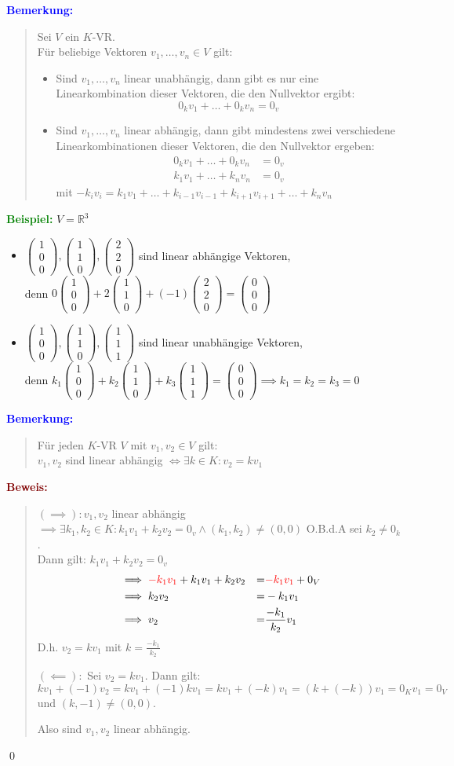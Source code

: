 \documentclass{article}
\newcommand{\blue}[1]{\textcolor{blue}{#1}}
\newcommand{\green}[1]{\textcolor{green}{#1}}
\newcommand{\maroon}[1]{\textcolor{maroon}{#1}}
\newcommand{\ex}{\green{\textbf{Beispiel: }}}
\newcommand{\an}[1]{\blue{\textbf{Bemerkung: }}\begin{quote}#1\end{quote}}
\newcommand{\pr}[1]{\maroon{\textbf{Beweis: }}\begin{quote}#1\end{quote}\qed}
\newcommand{\R}{\mathbb{R}}
\newcommand{\vvvec}[3]{\begin{pmatrix}#1\\#2\\#3\end{pmatrix}}
\begin{document}
\an{
    Sei $V$ ein $K$-VR.\\
    Für beliebige Vektoren $v_1, \dots, v_n \in V$ gilt:
    \begin{itemize}
        \item Sind $v_1, \dots, v_n$ linear unabhängig, dann gibt es nur eine Linearkombination dieser Vektoren, die den Nullvektor ergibt:
        \[
            0_kv_1 + \dots + 0_kv_n = 0_v
        \]
        \item Sind $v_1, \dots, v_n$ linear abhängig, dann gibt mindestens zwei verschiedene Linearkombinationen dieser Vektoren, die den Nullvektor ergeben:
        \[
            \begin{split}
                0_kv_1 + \dots + 0_kv_n &= 0_v\\
                k_1v_1 + \dots + k_nv_n &= 0_v
            \end{split}
        \]
        mit $-k_iv_i = k_1v_1 + \dots + k_{i-1}v_{i-1} + k_{i+1}v_{i+1} + \dots + k_nv_n$
    \end{itemize}
}
\ex $V = \R^3$
\begin{itemize}
    \item $\vvvec{1}{0}{0}, \vvvec{1}{1}{0}, \vvvec{2}{2}{0}$ sind linear abhängige Vektoren,\\
    denn $0 \vvvec{1}{0}{0} + 2 \vvvec{1}{1}{0} + (-1) \vvvec{2}{2}{0} = \vvvec{0}{0}{0}$
    \item $\vvvec{1}{0}{0}, \vvvec{1}{1}{0}, \vvvec{1}{1}{1}$ sind linear unabhängige Vektoren,\\
    denn $k_1 \vvvec{1}{0}{0} + k_2 \vvvec{1}{1}{0} + k_3 \vvvec{1}{1}{1} = \vvvec{0}{0}{0} \implies k_1 = k_2 = k_3 = 0$
\end{itemize}
\an{
    Für jeden $K$-VR $V$ mit $v_1,v_2 \in V$ gilt:\\
    $v_1,v_2$ sind linear abhängig $\iff \exists k \in K: v_2 = kv_1$
}
\pr{
    $(\implies): v_1, v_2$ linear abhängig\\
    $\implies \exists k_1,k_2 \in K: k_1v_1 + k_2v_2 = 0_v \land (k_1,k_2) \neq (0,0)$
    O.B.d.A sei $k_2 \neq 0_k$.\\
    Dann gilt: $k_1v_1 + k_2v_2 = 0_v$
    \begin{align*}
        &\implies \textcolor{red}{-k_1v_1} + k_1v_1 + k_2v_2 &=& \textcolor{red}{-k_1v_1} + 0_V \\
        &\implies k_2v_2 &=& -k_1v_1\\
        &\implies v_2 &=& \frac{-k_1}{k_2}v_1
    \end{align*}
    D.h. $v_2 = kv_1$ mit $k = \frac{-k_1}{k_2}$

    $(\impliedby):$ Sei $v_2 = kv_1$. Dann gilt:\\
    $kv_1 + (-1)v_2 = kv_1 + (-1)kv_1 = kv_1 + (-k)v_1 = (k+ (-k))v_1 = 0_Kv_1 = 0_V$ und $(k,-1) \neq (0,0)$.

    Also sind $v_1,v_2$ linear abhängig.
}
\end{document}
